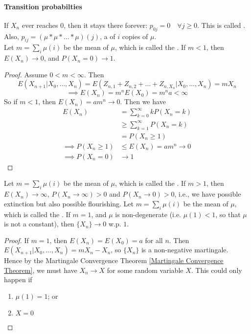 \documentclass[11pt]{article}
\begin{document}
   	\paragraph{Transition probabilties}
   	If $X_n$ ever reaches 0, then it stays there forever: $p_{0j} = 0\quad \forall j\geq0$. This is called .\\ Also, $p_{ij} = (\mu \ast \mu \ast \hdots \ast \mu)(j)$, a  of $i$ copies of $\mu$.\\
   	\theorem
   	Let $m = \sum_{i}\mu(i)$ be the mean of $\mu$, which is called the . If $m < 1$, then $E(X_n) \rightarrow 0$, and $P(X_n = 0) \rightarrow 1$.
   	\begin{proof}
   		   	Assume $0 < m < \infty$. Then
   	$$E(X_{n+1}|X_0, \hdots, X_n) = E(Z_{n,1} + Z_{n,2} + \hdots + Z_{n,X_n}|X_0, \hdots, X_n) = mX_n$$
   	$$\implies E(X_n) = m^nE(X_0) = m^n a < \infty$$
   	So if $m < 1$, then $E(X_n) = am^n \rightarrow 0$. Then we have
   	\begin{align*}
   		E(X_n) &= \sum_{k=0}^\infty kP(X_n = k) \\
   		&\geq \sum_{k=1}^\infty P(X_n = k) \\
   		&= P(X_n \geq 1) \\
   		\implies P(X_n \geq 1) &\leq E(X_n) = am^n \rightarrow 0 \\
   		\implies P(X_n = 0) &\rightarrow 1
   	\end{align*}
   	\end{proof}
   	\fact   Let $m = \sum_{i}\mu(i)$ be the mean of $\mu$, which is called the . If $m > 1$, then $E(X_n) \rightarrow \infty$, $P(X_n \rightarrow \infty) > 0$ and $P(X_n \rightarrow 0) > 0$, i.e., we have possible extinction but also possible flourishing.
   	\theorem  Let $m = \sum_{i}\mu(i)$ be the mean of $\mu$, which is called the . If $m = 1$, and $\mu$ is non-degenerate (i.e. $\mu(1) < 1$, so that $\mu$ is not a constant), then $\{X_n\} \rightarrow 0$ w.p. $1$.
   	\begin{proof}
   		If $m=1$, then $E(X_n) = E(X_0) = a$ for all $n$. Then $E(X_{n+1}|X_0, \hdots, X_n) = mX_n - X_n$, so $\{X_n\}$ is a non-negative martingale.\\
   		Hence by the Martingale Convergence Theorem \ref{Martingale Convergence Theorem}, we must have $X_n \rightarrow X$ for some random variable $X$. This could only happen if
   		\begin{enumerate}
   			\item $\mu(1) = 1$; or
   			\item $X = 0$
   		\end{enumerate}
   	\end{proof}
   	
\end{document}
